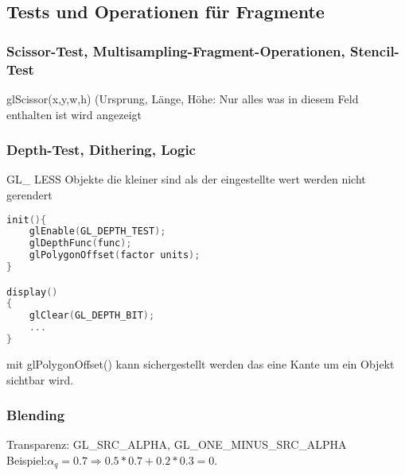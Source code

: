 \documentclass{scrreprt}
\begin{document}
\subsection{Tests und Operationen für Fragmente}
\subsubsection{Scissor-Test, Multisampling-Fragment-Operationen, Stencil-Test}
glScissor(x,y,w,h) (Ursprung, Länge, Höhe: Nur alles was in diesem Feld enthalten ist wird angezeigt
\subsubsection{Depth-Test, Dithering, Logic}
GL\_ LESS Objekte die kleiner sind als der eingestellte wert werden nicht gerendert
\begin{lstlisting}[language=C++]
init(){
	glEnable(GL_DEPTH_TEST);
	glDepthFunc(func);
	glPolygonOffset(factor units);
}

display()
{
	glClear(GL_DEPTH_BIT);
	...
}
\end{lstlisting}
mit glPolygonOffset() kann sichergestellt werden das eine Kante um ein Objekt sichtbar wird.
\subsubsection{Blending}
Transparenz: GL\_SRC\_ALPHA, GL\_ONE\_MINUS\_SRC\_ALPHA\\
Beispiel:$\alpha_q = 0.7 \Rightarrow 0.5*0.7+0.2*0.3 = 0.$
\end{document}
